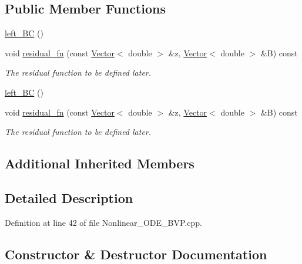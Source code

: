 \subsection*{Public Member Functions}
\begin{DoxyCompactItemize}
\item 
\hyperlink{classLuna_1_1left__BC_aad6be08c3e07998f09dd7d8ac1876e5c}{left\+\_\+\+BC} ()
\item 
void \hyperlink{classLuna_1_1left__BC_a01645de89a78c7c925d60bb68e994c90}{residual\+\_\+fn} (const \hyperlink{classLuna_1_1Vector}{Vector}$<$ double $>$ \&z, \hyperlink{classLuna_1_1Vector}{Vector}$<$ double $>$ \&B) const
\begin{DoxyCompactList}\small\item\em The residual function to be defined later. \end{DoxyCompactList}\item 
\hyperlink{classLuna_1_1left__BC_aad6be08c3e07998f09dd7d8ac1876e5c}{left\+\_\+\+BC} ()
\item 
void \hyperlink{classLuna_1_1left__BC_a01645de89a78c7c925d60bb68e994c90}{residual\+\_\+fn} (const \hyperlink{classLuna_1_1Vector}{Vector}$<$ double $>$ \&z, \hyperlink{classLuna_1_1Vector}{Vector}$<$ double $>$ \&B) const
\begin{DoxyCompactList}\small\item\em The residual function to be defined later. \end{DoxyCompactList}\end{DoxyCompactItemize}
\subsection*{Additional Inherited Members}


\subsection{Detailed Description}


Definition at line 42 of file Nonlinear\+\_\+\+O\+D\+E\+\_\+\+B\+V\+P.\+cpp.



\subsection{Constructor \& Destructor Documentation}
\mbox{\label{classLuna_1_1left__BC_aad6be08c3e07998f09dd7d8ac1876e5c}} 
